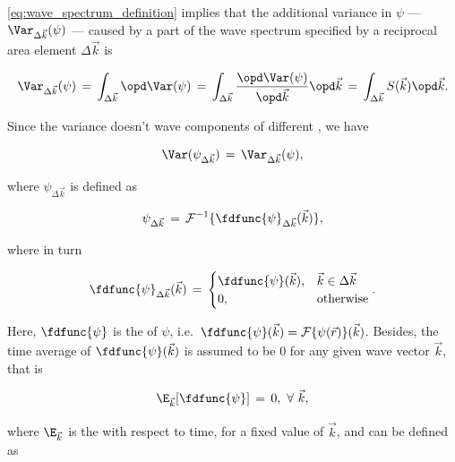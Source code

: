 \eqref{eq:wave_spectrum_definition} implies that the additional variance in $\psi$ --- $\Var_{\Delta\vec{k}}(\psi)$ --- caused by a part of the wave spectrum specified by a reciprocal area element $\Delta\vec{k}$ is

\begin{equation} \label{eq:variance_k_eta}
\Var_{\Delta\vec{k}}(\psi) \,=\, \int_{\Delta\vec{k}}\opd \Var(\psi) \,=\, \int_{\Delta\vec{k}}\frac{\opd \Var(\psi)}{\opd\vec{k}}\opd\vec{k} \,=\, \int_{\Delta\vec{k}}S(\vec{k})\opd\vec{k}.
\end{equation}

Since the variance doesn't \correlate wave components of different \wavelengths, we have

\begin{equation} \label{eq:variance_k_eta_to_variance_eta_k}
\Var(\psi_{\Delta\vec{k}}) \,=\, \Var_{\Delta\vec{k}}(\psi),
\end{equation}

where $\psi_{\Delta\vec{k}}$ is defined as

\begin{equation} \label{eq:eta_k_of_fd_eta_k}
\psi_{\Delta\vec{k}} \,=\, \mathcal{F}^{-1}\{\fdfunc{\psi}_{\Delta\vec{k}}(\vec{k})\},
\end{equation}

where in turn

\begin{equation} \label{eq:fd_eta_delta_k_definition}
\fdfunc{\psi}_{\Delta\vec{k}}(\vec{k}) \,=\, \begin{cases}
\fdfunc{\psi}(\vec{k}), & \vec{k} \in \Delta\vec{k} \\
0, & \text{otherwise}
\end{cases}.
\end{equation}

Here, $\fdfunc{\psi}$ is the  of $\psi$, i.e.\ $\fdfunc{\psi}(\vec{k}) = \mathcal{F}\{\psi(\vec{r})\}(\vec{k})$. Besides, the time average of $\fdfunc{\psi}(\vec{k})$ is assumed to be 0 for any given wave vector $\vec{k}$, that is

\begin{equation} \label{eq:zero_expectation_value_reciprocal_space}
\E_{\vec{k}}[\fdfunc{\psi}] \,=\, 0,\ \forall\ \vec{k},
\end{equation}

where $\E_{\vec{k}}$ is the  with respect to time, for a fixed value of $\vec{k}$, and can be defined as

